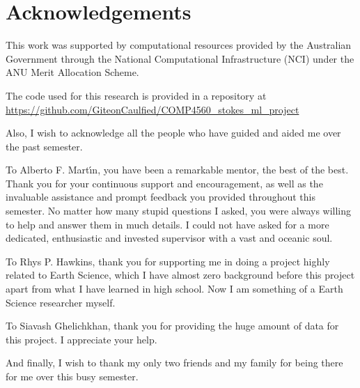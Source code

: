 \chapter*{Acknowledgements}

This work was supported by computational resources provided by the Australian Government through the National Computational Infrastructure (NCI) under the ANU Merit Allocation Scheme.

The code used for this research is provided in a repository at \url{https://github.com/GiteonCaulfied/COMP4560_stokes_ml_project}

Also, I wish to acknowledge all the people who have guided and aided me over the past semester.

To Alberto F. Mart\'{\i}n, you have been a remarkable mentor, the best of the best. Thank you for your continuous support and encouragement, as well as the invaluable assistance and prompt feedback you provided throughout this semester. No matter how many stupid questions I asked, you were always willing to help and answer them in much details. I could not have asked for a more dedicated, enthusiastic and invested supervisor with a vast and oceanic soul.

To Rhys P. Hawkins, thank you for supporting me in doing a project highly related to Earth Science, which I have almost zero background before this project apart from what I have learned in high school. Now I am something of a Earth Science researcher myself.

To Siavash Ghelichkhan, thank you for providing the huge amount of data for this project. I appreciate your help.

And finally, I wish to thank my only two friends and my family for being there for me over this busy semester.

